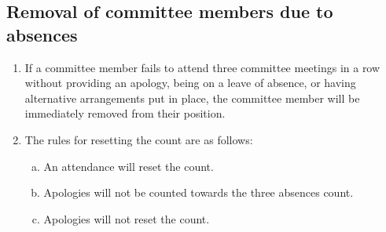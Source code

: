 \documentclass{constitution}
\begin{document}
\subsection{Removal of committee members due to absences}\label{committeeRemovalAbsences}
\begin{enumerate}[(1)]
    \item If a committee member fails to attend three committee meetings in a row without providing an apology, being on a leave of absence, or having alternative arrangements put in place, the committee member will be immediately removed from their position.
    \item The rules for resetting the count are as follows:
          \begin{enumerate}[(a)]
              \item An attendance will reset the count.
              \item Apologies will not be counted towards the three absences count.
              \item Apologies will not reset the count.
          \end{enumerate}
\end{enumerate}
\end{document}
